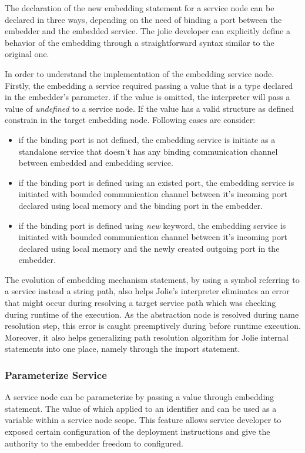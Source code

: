 The declaration of the new embedding statement for a service node can be declared in three ways, depending on the need of binding a port between the embedder and the embedded service. The jolie developer can explicitly define a behavior of the embedding through a straightforward syntax similar to the original one.

In order to understand the implementation of the embedding service node. Firstly, the embedding a service required passing a value that is a type declared in the embedder's parameter. if the value is omitted, the interpreter will pass a value of \textit{undefined} to a service node. If the value has a valid structure as defined constrain in the target embedding node. Following cases are consider:

\begin{itemize}
    \item if the binding port is not defined, the embedding service is initiate as a standalone service that doesn't has any binding communication channel between embedded and embedding service.
    \item if the binding port is defined using an existed port, the embedding service is initiated with bounded communication channel between it's incoming port declared using local memory and the binding port in the embedder.
    \item if the binding port is defined using \textit{new} keyword, the embedding service is initiated with bounded communication channel between it's incoming port declared using local memory and the newly created outgoing port in the embedder.
\end{itemize}

The evolution of embedding mechanism statement, by using a symbol referring to a service instead a string path, also helps Jolie's interpreter eliminates an error that might occur during resolving a target service path which was checking during runtime of the execution. As the abstraction node is resolved during name resolution step, this error is caught preemptively during before runtime execution. Moreover, it also helps generalizing path resolution algorithm for Jolie internal statements into one place, namely through the import statement.

\subsubsection{Parameterize Service}

A service node can be parameterize by passing a value through embedding statement. The value of which applied to an identifier and can be used as a variable within a service node scope. This feature allows service developer to exposed certain configuration of the deployment instructions and give the authority to the embedder freedom to configured.

